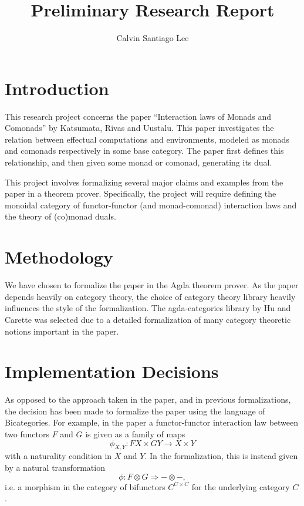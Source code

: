 \documentclass{amsart}
\title{Preliminary Research Report}
\author{Calvin Santiago Lee}
\theoremstyle{remark}
\begin{document}
\maketitle
\tableofcontents
\section{Introduction}

This research project concerns the paper ``Interaction laws of Monads and Comonads'' by Katsumata, Rivas and Uustalu\cite{monads-comonads}. This paper investigates the relation between effectual computations  and environments, modeled as monads and comonads respectively in some base category. The paper first defines this relationship, and then given some monad or comonad, generating its dual.

This project involves formalizing several major claims and examples from the paper in a theorem prover. Specifically, the project will require defining the monoidal category of functor-functor (and monad-comonad) interaction laws and the theory of (co)monad duals.

\section{Methodology}
We have chosen to formalize the paper in the Agda\cite{agda} theorem prover. As the paper depends heavily on category theory, the choice of category theory library heavily influences the style of the formalization. The agda-categories\cite{agda:categories} library by Hu and Carette was selected due to a detailed formalization of many category theoretic notions important in the paper.

\section{Implementation Decisions}\label{section:decisions}
As opposed to the approach taken in the paper, and in previous formalizations, the decision has been made to formalize the paper using the language of Bicategories\cite{nlab:bicategory}. For example, in the paper a functor-functor interaction law between two functors $F$ and $G$ is given as a family of maps 
\[\phi_{X,Y}\colon F X \times GY \to X \times Y\]
with a naturality condition in $X$ and $Y$.
In the formalization, this is instead given by a natural transformation \[\phi \colon F \otimes G \Rightarrow -\otimes -,\]
i.e. a morphism in the category of bifunctors \(C^{C\times C}\) for the underlying category $C$.
\end{document}
